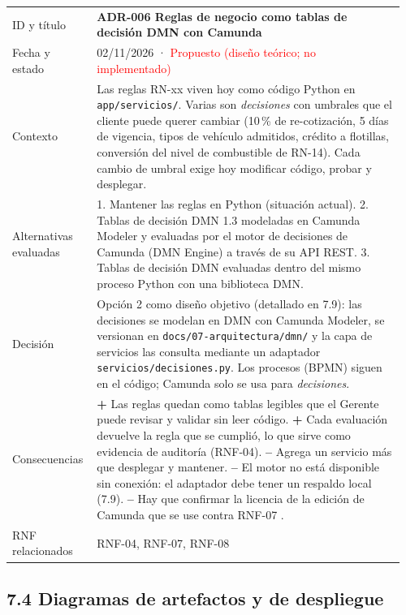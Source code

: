 {\begin{longtable}{@{}L{0.2\linewidth}L{0.76\linewidth}@{}}
\midrule
ID y título & \textbf{ADR-006 Reglas de negocio como tablas de decisión DMN con Camunda} \\
Fecha y estado & 02/11/2026 · \textcolor{red}{Propuesto (diseño teórico; no implementado)} \\
Contexto & Las reglas RN-xx viven hoy como código Python en \texttt{app/servicios/}. Varias son
\emph{decisiones} con umbrales que el cliente puede querer cambiar (10\,\% de re-cotización, 5 días de
vigencia, tipos de vehículo admitidos, crédito a flotillas, conversión del nivel de combustible de RN-14).
Cada cambio de umbral exige hoy modificar código, probar y desplegar. \\
Alternativas evaluadas & 1. Mantener las reglas en Python (situación actual). 2. Tablas de decisión
DMN 1.3 modeladas en Camunda Modeler y evaluadas por el motor de decisiones de Camunda (DMN Engine) a
través de su API REST. 3. Tablas de decisión DMN evaluadas dentro del mismo proceso Python con una
biblioteca DMN. \\
Decisión & Opción 2 como diseño objetivo (detallado en 7.9): las decisiones se modelan en DMN con Camunda
Modeler, se versionan en \texttt{docs/07-arquitectura/dmn/} y la capa de servicios las consulta mediante
un adaptador \texttt{servicios/decisiones.py}. Los procesos (BPMN) siguen en el código; Camunda solo se
usa para \emph{decisiones}. \\
Consecuencias & \textbf{+} Las reglas quedan como tablas legibles que el Gerente puede revisar y validar
sin leer código. \textbf{+} Cada evaluación devuelve la regla que se cumplió, lo que sirve como evidencia
de auditoría (RNF-04). \textbf{--} Agrega un servicio más que desplegar y mantener. \textbf{--} El
motor no está disponible sin conexión: el adaptador debe tener un respaldo local (7.9). \textbf{--}
Hay que confirmar la licencia de la edición de Camunda que se use contra RNF-07 . \\
RNF relacionados & RNF-04, RNF-07, RNF-08 \\
\end{longtable}
}

\subsection{7.4 Diagramas de artefactos y de
despliegue}\label{diagramas-de-artefactos-y-de-despliegue}


